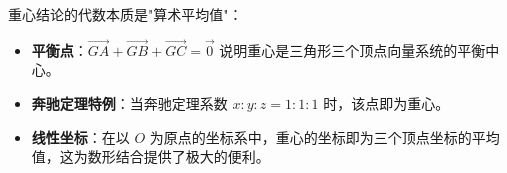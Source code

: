 \begin{explanationbox}
重心结论的代数本质是"算术平均值"：
\begin{itemize}
    \item \textbf{平衡点}：$\vec{GA} + \vec{GB} + \vec{GC} = \vec{0}$ 说明重心是三角形三个顶点向量系统的平衡中心。
    \item \textbf{奔驰定理特例}：当奔驰定理系数 $x:y:z = 1:1:1$ 时，该点即为重心。
    \item \textbf{线性坐标}：在以 $O$ 为原点的坐标系中，重心的坐标即为三个顶点坐标的平均值，这为数形结合提供了极大的便利。
\end{itemize}
\end{explanationbox}